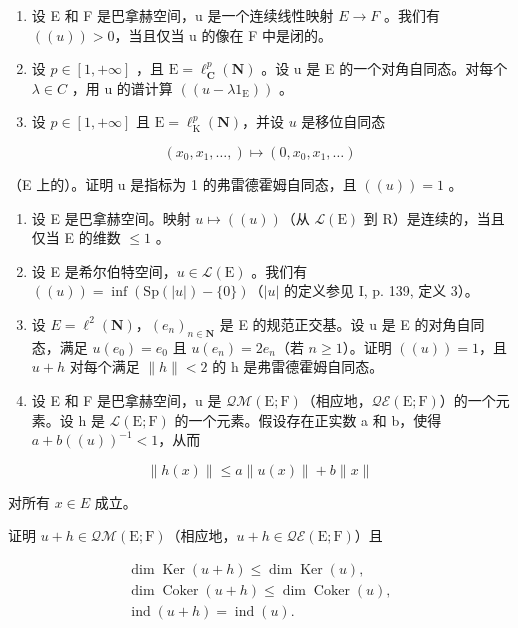 \exercisesection{}

\begin{enumerate}
\def\labelenumi{\arabic{enumi})}
\item
  设 E 和 F 是巴拿赫空间，u 是一个连续线性映射 \(E \rightarrow F\) 。我们有 \(((u)) > 0\)，当且仅当 u 的像在 F 中是闭的。
\item
  设 \(p \in [1, +\infty]\) ，且 \(\mathrm{E} = \ell_{\mathbf{C}}^{p}(\mathbf{N})\) 。设 u 是 E 的一个对角自同态。对每个 \(\lambda \in C\) ，用 u 的谱计算 \(((u - \lambda 1_{\mathrm{E}}))\) 。
\item
  设 \(p \in [1, +\infty]\) 且 \(\mathrm{E} = \ell_{\mathrm{K}}^{p}(\mathbf{N})\)，并设 \(u\) 是移位自同态
\end{enumerate}

\[
(x _ {0}, x _ {1}, \dots ,) \mapsto (0, x _ {0}, x _ {1}, \dots)
\]

（E 上的）。证明 u 是指标为 1 的弗雷德霍姆自同态，且 \(((u)) = 1\) 。

\begin{enumerate}
\def\labelenumi{\arabic{enumi})}
\setcounter{enumi}{3}
\item
  设 E 是巴拿赫空间。映射 \(u \mapsto ((u))\)（从 \(\mathcal{L}(\mathrm{E})\) 到 R）是连续的，当且仅当 E 的维数 \(\leqslant 1\) 。
\item
  设 E 是希尔伯特空间，\(u \in \mathcal{L}(\mathrm{E})\) 。我们有 \(((u)) = \inf(\mathrm{Sp}(|u|) - \{0\})\)（\(|u|\) 的定义参见 I, p. 139, 定义 3）。
\item
  设 \(E = \ell^{2}(\mathbf{N})\)，\((e_{n})_{n \in \mathbf{N}}\) 是 E 的规范正交基。设 u 是 E 的对角自同态，满足 \(u(e_{0}) = e_{0}\) 且 \(u(e_{n}) = 2e_{n}\)（若 \(n \geqslant 1\)）。证明 \(((u)) = 1\)，且 \(u + h\) 对每个满足 \(\|h\| < 2\) 的 h 是弗雷德霍姆自同态。
\item
  设 E 和 F 是巴拿赫空间，u 是 \(\mathcal{Q}\mathcal{M}(\mathrm{E};\mathrm{F})\)（相应地，\(\mathcal{Q}\mathcal{E}(\mathrm{E};\mathrm{F})\)）的一个元素。设 h 是 \(\mathcal{L}(\mathrm{E};\mathrm{F})\) 的一个元素。假设存在正实数 a 和 b，使得 \(a + b((u))^{-1} < 1\)，从而
\end{enumerate}

\[
\| h (x) \| \leqslant a \| u (x) \| + b \| x \|\tag{2}
\]

对所有 \(x \in E\) 成立。

证明 \(u + h \in \mathcal{Q}\mathcal{M}(\mathrm{E};\mathrm{F})\)（相应地，\(u + h \in \mathcal{Q}\mathcal{E}(\mathrm{E};\mathrm{F})\)）且

\[
\begin{array}{c} \dim \operatorname{Ker} (u + h) \leqslant \dim \operatorname{Ker} (u), \\ \dim \operatorname{Coker} (u + h) \leqslant \dim \operatorname{Coker} (u), \\ \operatorname{ind} (u + h) = \operatorname{ind} (u). \end{array}
\]

